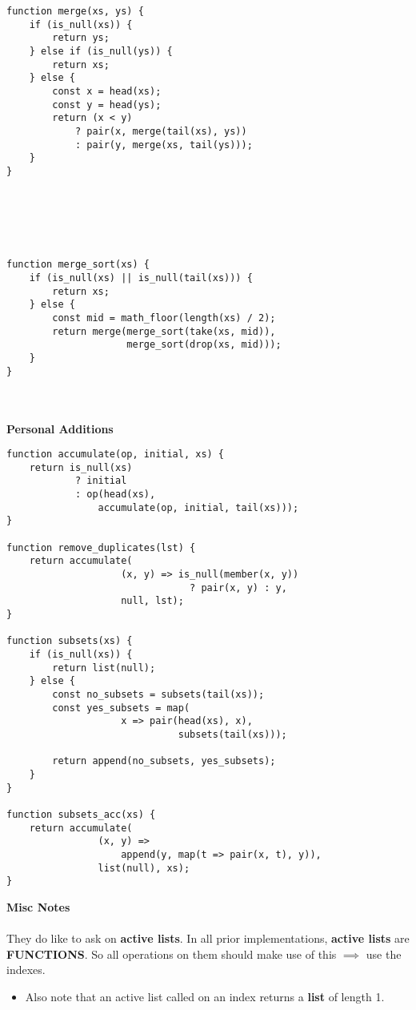 \documentclass[a4paper]{article} \usepackage[backend=biber, style=numeric, sorting=none]{biblatex}
\begin{document}
\begin{multicols*}{4}
\begin{verbatim}
function merge(xs, ys) {
    if (is_null(xs)) { 
        return ys;
    } else if (is_null(ys)) { 
        return xs;
    } else {
        const x = head(xs);
        const y = head(ys);
        return (x < y) 
            ? pair(x, merge(tail(xs), ys))
            : pair(y, merge(xs, tail(ys)));
    }
}






function merge_sort(xs) {
    if (is_null(xs) || is_null(tail(xs))) {
        return xs;
    } else {
        const mid = math_floor(length(xs) / 2);  
        return merge(merge_sort(take(xs, mid)), 
                     merge_sort(drop(xs, mid)));
    }
}
\end{verbatim}
\divider
\\
\\
{\small\textbf{Personal Additions}}

\begin{verbatim}
function accumulate(op, initial, xs) {
    return is_null(xs) 
            ? initial
            : op(head(xs), 
                accumulate(op, initial, tail(xs)));
}

function remove_duplicates(lst) {
    return accumulate(
                    (x, y) => is_null(member(x, y)) 
                                ? pair(x, y) : y,
                    null, lst);
}

function subsets(xs) {
    if (is_null(xs)) {
        return list(null);
    } else {
        const no_subsets = subsets(tail(xs));
        const yes_subsets = map(
                    x => pair(head(xs), x),
                              subsets(tail(xs)));
        
        return append(no_subsets, yes_subsets);
    }
}

function subsets_acc(xs) {
    return accumulate(
                (x, y) =>
                    append(y, map(t => pair(x, t), y)),
                list(null), xs);
}

\end{verbatim}

\vfill\null
\columnbreak

{\small\textbf{Misc Notes}}
\\ \\
They do like to ask on \textbf{active lists}. In all prior implementations, \textbf{active lists} are \textbf{FUNCTIONS}. So all operations on them should make use of this $\implies$ use the indexes. 
\begin{itemize}
    \item Also note that an active list called on an index returns a \textbf{list} of length 1.
\end{itemize}


\end{multicols*}
\end{document}
